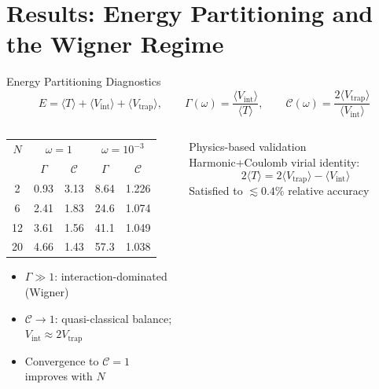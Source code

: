 \documentclass[aspectratio=169,10pt]{beamer}
\newcommand{\vev}[1]{\langle #1 \rangle}
\begin{document}
\section{Results: Energy Partitioning and the Wigner Regime}

\begin{frame}{Energy Partitioning Diagnostics}
  \[
    E = \vev{T} + \vev{V_\text{int}} + \vev{V_\text{trap}},
    \qquad
    \Gamma(\omega)=\frac{\vev{V_\text{int}}}{\vev{T}},
    \qquad
    \mathcal{C}(\omega)=\frac{2\vev{V_\text{trap}}}{\vev{V_\text{int}}}
  \]
  \begin{columns}[T]
    \begin{column}{0.52\textwidth}
      \small\renewcommand{\arraystretch}{1.25}
      \begin{tabular}{ccccc}
        \toprule
        $N$
          & \multicolumn{2}{c}{$\omega=1$}
          & \multicolumn{2}{c}{$\omega=10^{-3}$} \\
        \cmidrule(lr){2-3}\cmidrule(lr){4-5}
          & $\Gamma$ & $\mathcal{C}$
          & $\Gamma$ & $\mathcal{C}$ \\
        \midrule
        2  & 0.93 & 3.13 & 8.64  & 1.226 \\
        6  & 2.41 & 1.83 & 24.6  & 1.074 \\
        12 & 3.61 & 1.56 & 41.1  & 1.049 \\
        20 & 4.66 & 1.43 & 57.3  & 1.038 \\
        \bottomrule
      \end{tabular}
      \medskip
      \begin{itemize}
        \item $\Gamma\gg1$: interaction-dominated (Wigner)
        \item $\mathcal{C}\to1$: quasi-classical balance;
              $V_\text{int}\approx2V_\text{trap}$
        \item Convergence to $\mathcal{C}=1$ improves with $N$
      \end{itemize}
    \end{column}
    \begin{column}{0.45\textwidth}
      \begin{block}{Physics-based validation}
        Harmonic+Coulomb virial identity:
        \[
          2\vev{T} = 2\vev{V_\text{trap}} - \vev{V_\text{int}}
        \]
        Satisfied to $\lesssim0.4\%$ relative accuracy

\end{block}
\end{column}
\end{columns}
\end{frame}
\end{document}
